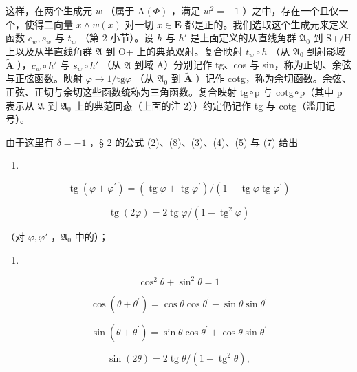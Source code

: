 这样，在两个生成元 \(w\) （属于 \(\mathrm{A}(\Phi)\) ，满足 \(w^{2} = -1\) ）之中，存在一个且仅一个，使得二向量 \(x \wedge w(x)\) 对一切 \(x\in\mathbf{E}\) 都是正的。我们选取这个生成元来定义函数 \(c_{w}, s_{w}\) 与 \(t_{w}\) （第 2 小节）。设 \(h\) 与 \(h'\) 是上面定义的从直线角群 \(\mathfrak{A}_{0}\) 到 S+/H 上以及从半直线角群 \(\mathfrak{A}\) 到 O+ 上的典范双射。复合映射 \(t_{w}\circ h\) （从 \(\mathfrak{A}_{0}\) 到射影域 \(\tilde{\mathbf{A}}\) ），\(c_{w}\circ h'\) 与 \(s_{w}\circ h'\) （从 \(\mathfrak{A}\) 到域 A）分别记作 tg、cos 与 sin，称为正切、余弦与正弦函数。映射 \(\varphi\to1/\mathrm{tg}\varphi\) （从 \(\mathfrak{A}_{0}\) 到 \(\tilde{\mathbf{A}}\) ）记作 cotg，称为余切函数。余弦、正弦、正切与余切这些函数统称为三角函数。复合映射 tg∘p 与 cotg∘p（其中 p 表示从 \(\mathfrak{A}\) 到 \(\mathfrak{A}_{0}\) 上的典范同态（上面的注 2））约定仍记作 tg 与 cotg（滥用记号）。

由于这里有 \(\delta = -1\) ，§ 2 的公式 (2)、(8)、(3)、(4)、(5) 与 (7) 给出

\begin{enumerate}
\def\labelenumi{(\arabic{enumi})}
\setcounter{enumi}{10}
\tightlist
\item
\end{enumerate}

\[
\operatorname{tg} \left(\varphi + \varphi^ {\prime}\right) = (\operatorname{tg} \varphi + \operatorname{tg} \varphi^ {\prime}) / (1 - \operatorname{tg} \varphi \operatorname{tg} \varphi^ {\prime})\tag{12}
\]

\[
\operatorname{tg} (2 \varphi) = 2 \operatorname{tg} \varphi / (1 - \operatorname{tg} ^ {2} \varphi)
\]

（对 \(\varphi, \varphi'\) ，\(\mathfrak{A}_0\) 中的）；

\begin{enumerate}
\def\labelenumi{(\arabic{enumi})}
\setcounter{enumi}{12}
\tightlist
\item
\end{enumerate}

\[
\cos^ {2} \theta + \sin^ {2} \theta = 1\tag{14}
\]

\[
\cos (\theta + \theta^ {\prime}) = \cos \theta \cos \theta^ {\prime} - \sin \theta \sin \theta^ {\prime}\tag{15}
\]

\[
\sin (\theta + \theta^ {\prime}) = \sin \theta \cos \theta^ {\prime} + \cos \theta \sin \theta^ {\prime}\tag{16}
\]

\[
\sin (2 \theta) = 2 \operatorname{tg} \theta / (1 + \operatorname{tg} ^ {2} \theta),
\]

